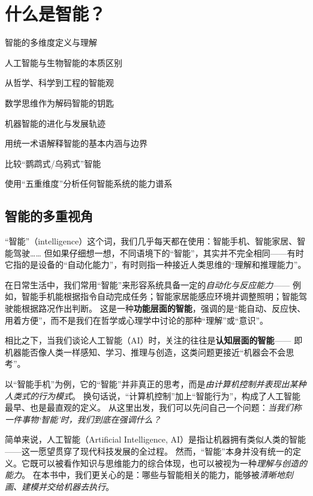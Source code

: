 \chapter{ 什么是智能？}
 \begin{introduction}
  \item 智能的多维度定义与理解
  \item 人工智能与生物智能的本质区别
  \item 从哲学、科学到工程的智能观
  \item 数学思维作为解码智能的钥匙
  \item 机器智能的进化与发展轨迹
\end{introduction}

\begin{introduction}
  \item 用统一术语解释智能的基本内涵与边界
  \item 比较“鹦鹉式/乌鸦式”智能
  \item 使用“五重维度”分析任何智能系统的能力谱系
\end{introduction}

\section{智能的多重视角}
“智能”（intelligence）这个词，我们几乎每天都在使用：智能手机、智能家居、智能驾驶……  
但如果仔细想一想，不同语境下的“智能”，其实并不完全相同——有时它指的是设备的“自动化能力”，有时则指一种接近人类思维的“理解和推理能力”。  

在日常生活中，我们常用“智能”来形容系统具备一定的\emph{自动化与反应能力}——  
例如，智能手机能根据指令自动完成任务；智能家居能感应环境并调整照明；智能驾驶能根据路况作出判断。  
这是一种\textbf{功能层面的智能}，强调的是“能自动、反应快、用着方便”，而不是我们在哲学或心理学中讨论的那种“理解”或“意识”。  

相比之下，当我们谈论人工智能（AI）时，关注的往往是\textbf{认知层面的智能}——  
即机器能否像人类一样感知、学习、推理与创造，这类问题更接近“机器会不会思考”。  

以“智能手机”为例，它的“智能”并非真正的思考，而是\emph{由计算机控制并表现出某种人类式的行为模式}。  
换句话说，“计算机控制”加上“智能行为”，构成了人工智能最早、也是最直观的定义。  
从这里出发，我们可以先问自己一个问题：\emph{当我们称一件事物‘智能’时，我们到底在强调什么？}  
 
简单来说，人工智能（Artificial Intelligence, AI）是指让机器拥有类似人类的智能——这一愿望贯穿了现代科技发展的全过程。 
然而，“智能”本身并没有统一的定义。它既可以被看作知识与思维能力的综合体现，也可以被视为一种\emph{理解与创造的能力}。  
在本书中，我们更关心的是：哪些与智能相关的能力，能够被\emph{清晰地刻画、建模并交给机器去执行}。  

